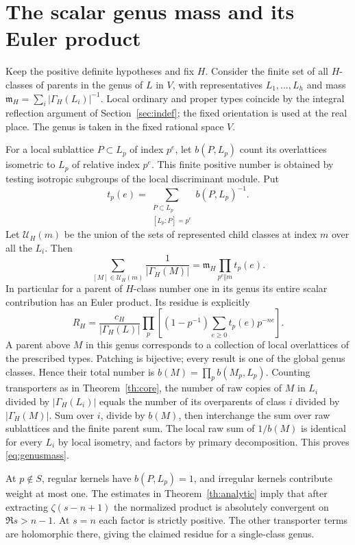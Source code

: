 \section{The scalar genus mass and its Euler product}\label{sec:genusmass}
Keep the positive definite hypotheses and fix $H$. Consider the finite set of all $H$-classes of parents in the genus of $L$ in $V$, with representatives $L_1,\ldots,L_h$ and mass $\mathfrak m_H=\sum_i|\Gamma_H(L_i)|^{-1}$. Local ordinary and proper types coincide by the integral reflection
argument of Section~\ref{sec:indef}; the fixed orientation is used at
the real place. The genus is taken in the fixed rational space $V$.

For a local sublattice $P\subset L_p$ of index $p^e$, let $b(P,L_p)$ count its overlattices isometric to $L_p$ of relative index $p^e$. This finite positive number is obtained by testing isotropic subgroups of the local discriminant module. Put
\[
 t_p(e)=\sum_{\substack{P\subset L_p\\{}[L_p:P]=p^e}}b(P,L_p)^{-1}.
\]
Let $\mathcal U_H(m)$ be the union of the sets of represented child classes at index $m$ over all the $L_i$. Then
\begin{equation}\label{eq:genusmass}
 \sum_{[M]\in\mathcal U_H(m)}\frac{1}{|\Gamma_H(M)|}
       =\mathfrak m_H\prod_{p^e\Vert m}t_p(e).
\end{equation}
In particular for a parent of $H$-class number one in its genus its entire scalar contribution has an Euler product. Its residue is explicitly
\[
 R_H=\frac{c_H}{|\Gamma_H(L)|}
        \prod_p\left[(1-p^{-1})\sum_{e\ge0}t_p(e)p^{-ne}\right].
\]
A parent above $M$ in this genus corresponds to a collection of local overlattices of the prescribed types. Patching is bijective; every result is one of the global genus classes. Hence their total number is $b(M)=\prod_p b(M_p,L_p)$. Counting transporters as in Theorem~\ref{th:core}, the number of raw copies of $M$ in $L_i$ divided by $|\Gamma_H(L_i)|$ equals the number of its overparents of class $i$ divided by $|\Gamma_H(M)|$. Sum over $i$, divide by $b(M)$, then interchange the sum over raw sublattices and the finite parent sum. The local raw sum of $1/b(M)$ is identical for every $L_i$ by local isometry, and factors by primary decomposition. This proves \eqref{eq:genusmass}.

At $p\notin S$, regular kernels have $b(P,L_p)=1$, and
irregular kernels contribute weight at most one. The estimates in Theorem~\ref{th:analytic} imply that after extracting $\zeta(s-n+1)$ the normalized product is absolutely convergent on $\Re s>n-1$. At $s=n$ each factor is strictly positive. The other transporter terms are holomorphic there, giving the claimed residue for a single-class genus. 
